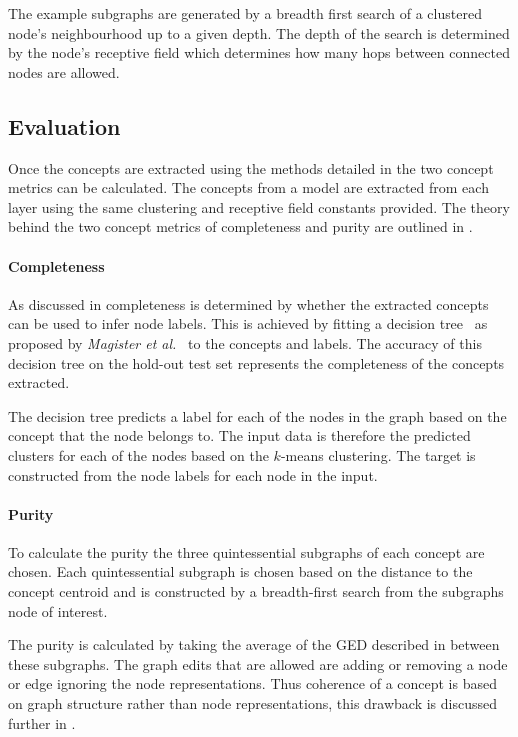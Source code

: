 The example subgraphs are generated by a breadth first search of a clustered node's neighbourhood up to a given depth.
The depth of the search is determined by the node's receptive field which determines how many hops between connected nodes are allowed.

\subsection{Evaluation}
\label{sec:concept-eval}

Once the concepts are extracted using the methods detailed in  the two concept metrics can be calculated.
The concepts from a model are extracted from each layer using the same clustering and receptive field constants provided.
The theory behind the two concept metrics of completeness and purity are outlined in .

\paragraph{Completeness}
As discussed in  completeness is determined by whether the extracted concepts can be used to infer node labels.
This is achieved by fitting a decision tree~\cite{kazhdan2020now} as proposed by \textit{Magister et al.}~\cite{magister2021gcexplainer} to the concepts and labels.
The accuracy of this decision tree on the hold-out test set represents the completeness of the concepts extracted.

The decision tree predicts a label for each of the nodes in the graph based on the concept that the node belongs to.
The input data is therefore the predicted clusters for each of the nodes based on the $k$-means clustering.
The target is constructed from the node labels for each node in the input.

\paragraph{Purity}
To calculate the purity the three quintessential subgraphs of each concept are chosen.
Each quintessential subgraph is chosen based on the distance to the concept centroid and is constructed by a breadth-first search from the subgraphs node of interest.

The purity is calculated by taking the average of the GED described in  between these subgraphs.
The graph edits that are allowed are adding or removing a node or edge ignoring the node representations.
Thus coherence of a concept is based on graph structure rather than node representations, this drawback is discussed further in .

